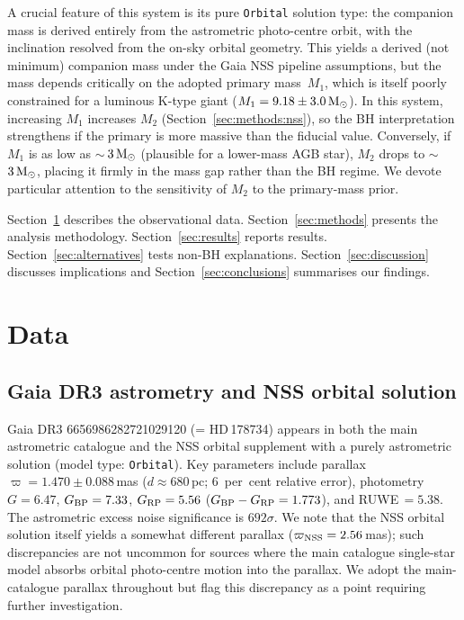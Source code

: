 \documentclass[usenatbib,fleqn]{mnras}
\newcommand{\Msun}{{\rm M}_\odot}
\begin{document}
A crucial feature of this system is its pure \texttt{Orbital}
solution type: the companion mass is derived entirely from the
astrometric photo-centre orbit, with the inclination resolved from
the on-sky orbital geometry.  This yields a derived (not minimum)
companion mass under the Gaia NSS pipeline assumptions, but the
mass depends critically on the adopted primary mass~$M_1$, which
is itself poorly constrained for a luminous K-type giant
($M_1 = 9.18 \pm 3.0\,\Msun$).  In this system, increasing $M_1$
increases $M_2$ (Section~\ref{sec:methods:nss}), so the BH
interpretation strengthens if the primary is more massive than the
fiducial value.  Conversely, if $M_1$ is as low as
$\sim$\,$3\,\Msun$ (plausible for a lower-mass AGB star), $M_2$
drops to $\sim$\,$3\,\Msun$, placing it firmly in the mass gap
rather than the BH regime.  We devote particular attention to the
sensitivity of $M_2$ to the primary-mass prior.

Section~\ref{sec:data} describes the observational data.
Section~\ref{sec:methods} presents the analysis methodology.
Section~\ref{sec:results} reports results.
Section~\ref{sec:alternatives} tests non-BH explanations.
Section~\ref{sec:discussion} discusses implications and
Section~\ref{sec:conclusions} summarises our findings.

\section{Data}
\label{sec:data}

\subsection{Gaia DR3 astrometry and NSS orbital solution}
\label{sec:data:gaia}

Gaia DR3 6656986282721029120 (= HD\,178734) appears in both the
main astrometric catalogue and the NSS orbital supplement with a
purely astrometric solution (model type: \texttt{Orbital}).  Key
parameters include parallax
$\varpi = 1.470 \pm 0.088$\,mas
($d \approx 680$\,pc; 6~per~cent relative error), photometry
$G = 6.47$, $G_{\rm BP} = 7.33$, $G_{\rm RP} = 5.56$
($G_{\rm BP} - G_{\rm RP} = 1.773$), and RUWE$\,= 5.38$.
The astrometric excess noise significance is $692\sigma$.
We note that the NSS orbital solution itself yields a
somewhat different parallax ($\varpi_{\rm NSS} = 2.56$\,mas);
such discrepancies are not uncommon for sources where the main
catalogue single-star model absorbs orbital photo-centre motion
into the parallax.  We adopt the main-catalogue parallax
throughout but flag this discrepancy as a point requiring
further investigation.
\end{document}
